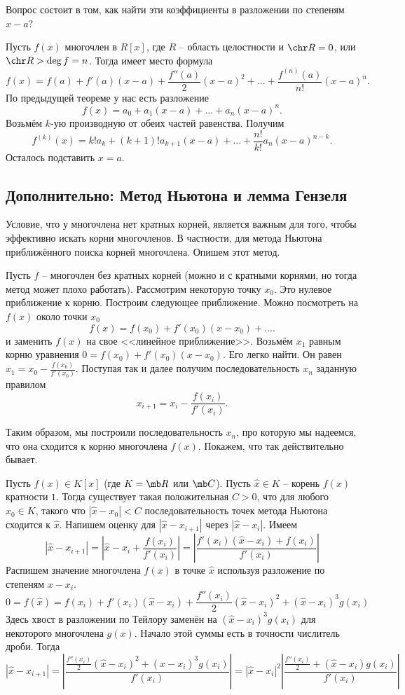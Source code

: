 Вопрос состоит в том, как найти эти коэффициенты в разложении по степеням $x-a$?

Пусть $f(x)$ многочлен в $R[x]$, где $R$ -- область целостности и  $\chr R =0$, или $\chr R > \deg f=n$. Тогда имеет место формула
$$f(x)= f(a)+f'(a)(x-a)+\frac{f''(a)}{2}(x-a)^2+  \dots + \frac{f^{(n)}(a)}{n!}(x-a)^n.$$
\proof По предыдущей теореме у нас есть разложение
$$f(x)=a_0+a_1(x-a)+\dots+a_n(x-a)^n.$$
Возьмём $k$-ую производную от обеих частей равенства. Получим
$$ f^{(k)}(x)=k!a_k+(k+1)!a_{k+1}(x-a)+\dots+\frac{n!}{k!}a_n(x-a)^{n-k}.$$
Осталось подставить $x=a$.
\endproof
\ethrm







\subsection{Дополнительно: Метод Ньютона и лемма Гензеля} 

Условие, что у многочлена нет кратных корней, является важным для того, чтобы эффективно искать корни многочленов. В частности, для метода Ньютона приближённого поиска корней многочлена. Опишем этот метод.


Пусть $f$ -- многочлен без кратных корней (можно и с кратными корнями, но тогда метод может плохо работать). Рассмотрим некоторую точку $x_0$. Это нулевое приближение к корню. Построим следующее приближение. Можно посмотреть на $f(x)$ около точки $x_0$ 
$$f(x)=f(x_0)+f'(x_0)(x-x_0)+\dots.$$
и заменить $f(x)$ на свое <<линейное приближение>>.
Возьмём $x_1$ равным корню уравнения $0=f(x_0)+f'(x_0)(x-x_0)$. Его легко найти. Он равен $x_1=x_0-\frac{f(x_0)}{f'(x_0)}$. Поступая так и далее получим последовательность $x_n$ заданную правилом $$x_{i+1}=x_i-\frac{f(x_i)}{f'(x_i)}.$$

Таким образом, мы построили последовательность $x_n$, про которую мы надеемся, что она сходится к корню многочлена $f(x)$. Покажем, что так действительно бывает.

\thrm Пусть $f(x)\in K[x]$ (где $K=\mb R$ или $\mb C$). Пусть $\hat{x}\in K$ -- корень $f(x)$ кратности $1$. Тогда существует такая положительная $C>0$, что для любого $x_0 \in K$, такого что $|\hat{x}-x_0|<C$ последовательность точек метода Ньютона сходится к $\hat{x}$.
\ethrm
\proof Напишем оценку для $|\hat{x}-x_{i+1}|$ через $|\hat{x}-x_i|$. Имеем 
$$|\hat{x}-x_{i+1}|=\left|\hat{x}-x_i+\frac{f(x_i)}{f'(x_i)}\right|=\left|\frac{f'(x_i)(\hat{x}-x_i)+f(x_i)}{f'(x_i)}\right|$$
Распишем значение многочлена $f(x)$ в точке $\hat{x}$ используя разложение по степеням $x-x_i$. 
$$0=f(\hat{x})= f(x_i)+f'(x_i)(\hat{x}-x_i)+\frac{f''(x_i)}{2}(\hat{x}-x_i)^2 + (\hat{x}-x_i)^3 g(x_i)$$
Здесь хвост в разложении по Тейлору заменён на $(\hat{x}-x_i)^3 g(x_i)$ для некоторого многочлена $g(x)$. Начало этой суммы есть в точности числитель дроби. Тогда
$$|\hat{x}-x_{i+1}|=\left|\frac{\frac{f''(x_i)}{2}(\hat{x}-x_i)^2 + (\hat{x}-x_i)^3 g(x_i)}{f'(x_i)}\right|=|\hat{x}-x_i|^2\left|\frac{\frac{f''(x_i)}{2} + (\hat{x}-x_i) g(x_i)}{f'(x_i)}\right|$$

